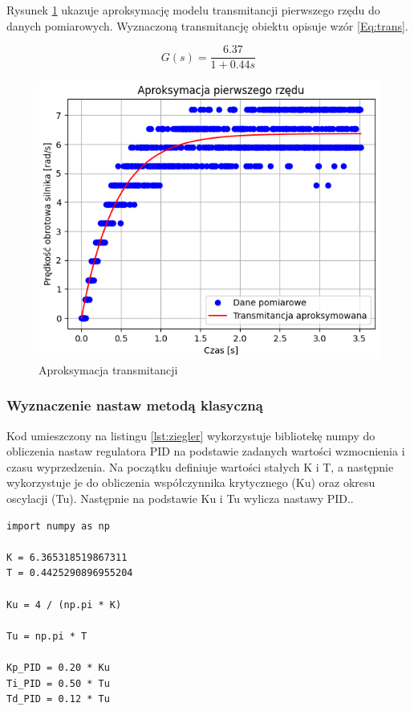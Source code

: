 \documentclass[12pt,twoside]{article}
\begin{document}
Rysunek \ref{Fig:aprox} ukazuje aproksymację modelu transmitancji pierwszego rzędu do danych pomiarowych. Wyznaczoną transmitancję obiektu opisuje wzór \ref{Eq:trans}.

\begin{equation}
G(s) = \frac{6.37}{1 + 0.44s}
\label{Eq:trans}
\end{equation}

\begin{figure}[ht]%
 \centering%
 \includegraphics[width=12cm]{figures/PID/aprox.png}%
 \caption{Aproksymacja transmitancji}%
 \label{Fig:aprox}%
\end{figure}

\newpage

\subsubsection{Wyznaczenie nastaw metodą klasyczną}

Kod umieszczony na listingu \ref{lst:ziegler} wykorzystuje bibliotekę numpy do obliczenia nastaw regulatora PID na podstawie zadanych wartości wzmocnienia i czasu wyprzedzenia. Na początku definiuje wartości stałych K i T, a następnie wykorzystuje je do obliczenia współczynnika krytycznego (Ku) oraz okresu oscylacji (Tu). Następnie na podstawie Ku i Tu wylicza nastawy PID..

\begin{lstlisting}[caption={Kod z obliczeniami i wyświetleniem wyników}, label={lst:ziegler}]
import numpy as np

K = 6.365318519867311
T = 0.4425290896955204

Ku = 4 / (np.pi * K)

Tu = np.pi * T

Kp_PID = 0.20 * Ku
Ti_PID = 0.50 * Tu
Td_PID = 0.12 * Tu
\end{lstlisting}
\end{document}
